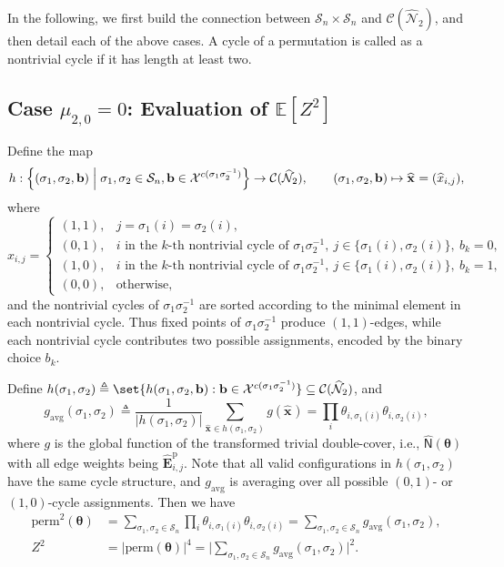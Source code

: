 \documentclass[conference]{IEEEtran}
\theoremstyle{plain}
\theoremstyle{definition}
\newcommand{\E}{\mathbb {E}}
\newcommand{\sfn}{\mathsf{N}}
\newcommand{\hatx}[1]{\widehat{x}_{ #1 }}
\newcommand{\hatbfx}[1][]{\widehat{\mathbf{x}}^{ #1 }}
\newcommand{\btheta}{\boldsymbol{\theta}}
\newcommand{\defeq}{\triangleq}
\newcommand{\validc}{\mathcal {C}(\widehat{\mathcal N}_2)}
\begin{document}
 In the following, we first build the connection between \(\mathcal S_n\times
 \mathcal S_n\) and \(\validc\), and then detail each of the above cases. A
 cycle of a permutation is called as a nontrivial cycle if it has length at
 least two.

 \subsection{Case $\mu_{2,0}=0$: Evaluation of $\E [Z^2]$}
 Define the map
 \[
  h:\Bigl\{(\sigma_1,\sigma_2,\mathbf b)
  \Bigm\vert \sigma_1,\sigma_2\in\mathcal{S}_n,\mathbf b\in \mathcal X^{c(\sigma_1\sigma_2^{-1})}\Bigr\}
  \to \validc,
  \qquad
  (\sigma_1,\sigma_2,\mathbf b)\mapsto \hatbfx=(\hatx{i,j}),
 \]
 where
 \[
  \hatx{i,j}=
  \begin{cases}
  (1,1), & j=\sigma_1(i)=\sigma_2(i),                                         \\
  (0,1), & i\text{ in the $k$-th nontrivial cycle of }\sigma_1\sigma_2^{-1},\
  j\in\{\sigma_1(i),\sigma_2(i)\},\ b_k=0,                                    \\
  (1,0), & i\text{ in the $k$-th nontrivial cycle of }\sigma_1\sigma_2^{-1},\
  j\in\{\sigma_1(i),\sigma_2(i)\},\ b_k=1,                                    \\
  (0,0), & \text{otherwise},
  \end{cases}
 \]
 and the nontrivial cycles of \(\sigma_1\sigma_2^{-1}\) are sorted according to
 the minimal element in each nontrivial cycle. Thus fixed points of
 $\sigma_1\sigma_2^{-1}$ produce $(1,1)$-edges, while each nontrivial cycle
 contributes two possible assignments, encoded by the binary choice $b_k$.

 Define $h(\sigma_1,\sigma_2)\defeq\set{h(\sigma_1,\sigma_2,\mathbf b):\mathbf
 b\in \mathcal X^{c(\sigma_1\sigma_2^{-1})}}\subseteq \mathcal
 C(\widehat{\mathcal N}_2)$, and
 \[
  g_\mathrm{avg} (\sigma_1,\sigma_2)\defeq
  \frac{1}{|h(\sigma_1,\sigma_2)|}\sum_{\hatbfx\in h(\sigma_1,\sigma_2)} g(\hatbfx)
  =\prod_{i}\theta_{i,\sigma_1(i)}\theta_{i,\sigma_2(i)},
 \]
 where $g$ is the global function of the transformed trivial double-cover,
 i.e., $\widehat{\sfn}(\btheta)$ with all edge weights being $\widehat{\mathbf
 E}^{\mathrm p}_{i,j}$. Note that all valid configurations in
 $h(\sigma_1,\sigma_2)$ have the same cycle structure, and $g_{\mathrm{avg}}$
 is averaging over all possible $(0,1)$- or $(1,0)$-cycle assignments. Then we
 have
 \begin{align*}
  \mathrm{perm}^2(\boldsymbol \theta) & =
  \sum_{\sigma_1,\sigma_2\in \mathcal{S}_n}\prod_{i}\theta_{i,\sigma_1(i)}\theta_{i,\sigma_2(i)} =
  \sum_{\sigma_1,\sigma_2\in \mathcal{S}_n} g_\mathrm{avg}(\sigma_1,\sigma_2), \\
  Z^2                                 & =|\mathrm{perm}(\boldsymbol\theta)|^4=
  \Biggl\lvert\sum_{\sigma_1,\sigma_2\in \mathcal{S}_n} g_\mathrm{avg}(\sigma_1,\sigma_2)\Biggr\rvert^2.
 \end{align*}
\end{document}
